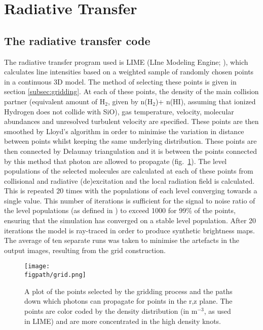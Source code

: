 \documentclass[useAMS,usenatbib]{mn2e}
\newcommand{\figpath}{/Users/bhargavvaidya/MyProject/work/Leeds_Uni/SiOJets_New/PAPER/PFIGS/}
\begin{document}
\section{Radiative Transfer}
\label{sec:radtrans}

\subsection{The radiative transfer code} \label{subsec:radiative_transfer_code}
The radiative transfer program used is LIME (LIne Modeling Engine;
\citealt{Brinch:2010p13078}), which  calculates line intensities based
on a weighted sample of randomly chosen points in a continuous 3D
model. The method of selecting these points is given in section
\ref{subsec:gridding}. At each of these points, the density of the
main collision partner (equivalent amount of H$_2$, given by n(H$_2$)+
n(HI), assuming that ionized Hydrogen does not collide with SiO), gas temperature, velocity, molecular abundances and unresolved turbulent velocity are specified. These points are then smoothed by Lloyd's algorithm \citep{Lloyd1982} in order to minimise the variation in distance between points whilst keeping the same underlying distribution. These points are then connected by Delaunay triangulation and it is between the points connected by this method that photon are allowed to propagate (fig.~\ref{grid}). The level populations of the selected molecules are calculated at each of these points from collisional and radiative (de)excitation and the local radiation field is calculated. This is repeated 20 times with the populations of each level converging towards a single value. This number of iterations is sufficient for the signal to noise ratio of the level populations (as defined in \citealt{Brinch:2010p13078}) to exceed 1000 for 99\% of the points, ensuring that the simulation has converged on a stable level population. After 20 iterations the model is ray-traced in order to produce synthetic brightness maps. The average of ten separate runs was taken to minimise the artefacts in the output images, resulting from the grid construction.%


\begin{figure}
 \texttt{[image: \\figpath/grid.png]}
 \caption{A plot of the points selected by the gridding process and the paths down which photons can propagate for points in the r,z plane. The points are color coded by the density distribution (in m$^{-3}$, as used in LIME) and are more concentrated in the high density knots.}
\label{grid} %
\end{figure}
\end{document}
